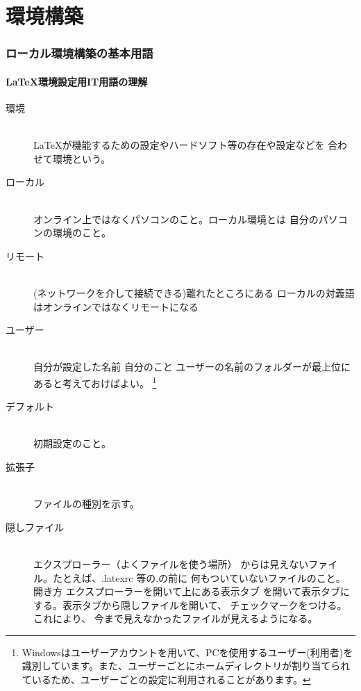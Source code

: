 \documentclass[titlepage]{ltjsarticle}
\begin{document}
\part{環境構築}
\section{ローカル環境構築の基本用語}
\subsection{\LaTeX 環境設定用IT用語の理解}

\begin{description}
  \item [環境] ~\\
    \LaTeX が機能するための設定やハードソフト等の存在や設定などを
    合わせて環境という。
  \item [ローカル] ~\\
    オンライン上ではなくパソコンのこと。ローカル環境とは
    自分のパソコンの環境のこと。
    
   
  \item[リモート] ~\\
    (ネットワークを介して接続できる)離れたところにある 
    ローカルの対義語はオンラインではなくリモートになる
  \item [ユーザー] ~\\
    自分が設定した名前 自分のこと
    ユーザーの名前のフォルダーが最上位にあると考えておけばよい。
    \footnote{Windowsはユーザーアカウントを用いて、PCを使用するユーザー(利用者)を識別しています。また、ユーザーごとにホームディレクトリが割り当てられているため、ユーザーごとの設定に利用されることがあります。}


  \item [デフォルト] ~\\
    初期設定のこと。
  \item[拡張子] ~\\
    ファイルの種別を示す。
  \item [隠しファイル] ~\\
    エクスプローラー（よくファイルを使う場所）
    からは見えないファイル。たとえば、.latexrc 等の.の前に
    何もついていないファイルのこと。
    開き方 エクスプローラーを開いて上にある表示タブ
    を開いて表示タブにする。表示タブから隠しファイルを開いて、
    チェックマークをつける。これにより、
    今まで見えなかったファイルが見えるようになる。


\end{description}
\end{document}
